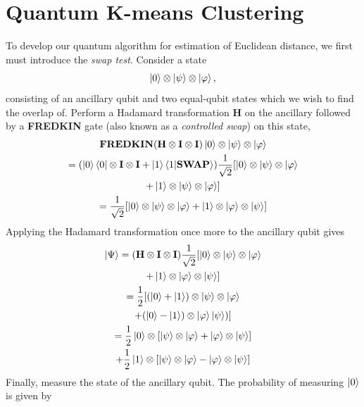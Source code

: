 \documentclass[twocolumn, english]{revtex4-2}
\numberwithin{equation}{section}
\begin{document}
\section{Quantum K-means Clustering}
To develop our quantum algorithm for estimation of Euclidean distance, we first must introduce the \textit{swap test}. Consider a state \begin{equation}\ket{0}\otimes\ket{\psi}\otimes\ket{\varphi},\end{equation} consisting of an ancillary qubit and two equal-qubit states which we wish to find the overlap of. Perform a Hadamard transformation \textbf{H} on the ancillary followed by a \textbf{FREDKIN} gate (also known as a \textit{controlled swap}) on this state, \begin{equation}\begin{gathered}
\textbf{FREDKIN}(\textbf{H}\otimes\textbf{I}\otimes\textbf{I})\ket{0}\otimes\ket{\psi}\otimes\ket{\varphi}\\
=(\ket{0}\bra{0}\otimes\textbf{I}\otimes\textbf{I}+\ket{1}\braket{1|\textbf{SWAP}})\frac{1}{\sqrt{2}}[\ket{0}\otimes\ket{\psi}\otimes\ket{\varphi}\\+\ket{1}\otimes\ket{\psi}\otimes\ket{\varphi}]\\
=\frac{1}{\sqrt{2}}[\ket{0}\otimes\ket{\psi}\otimes\ket{\varphi}+\ket{1}\otimes\ket{\varphi}\otimes\ket{\psi}]\end{gathered}\end{equation}
Applying the Hadamard transformation once more to the ancillary qubit gives
\begin{equation}\begin{gathered}
\ket{\Psi}=(\textbf{H}\otimes\textbf{I}\otimes\textbf{I})\frac{1}{\sqrt{2}}[\ket{0}\otimes\ket{\psi}\otimes\ket{\varphi}\\+\ket{1}\otimes\ket{\varphi}\otimes\ket{\psi}]\\
=\frac{1}{2}[(\ket{0}+\ket{1})\otimes\ket{\psi}\otimes\ket{\varphi}\\+(\ket{0}-\ket{1})\otimes\ket{\varphi}\ket{\psi})]\\
=\frac{1}{2}\ket{0}\otimes[\ket{\psi}\otimes\ket{\varphi}+\ket{\varphi}\otimes\ket{\psi}]\\+\frac{1}{2}\ket{1}\otimes[\ket{\psi}\otimes\ket{\varphi}-\ket{\varphi}\otimes\ket{\psi}]
\end{gathered}\end{equation}
Finally, measure the state of the ancillary qubit. The probability of measuring $\ket{0}$ is given by 
\end{document}
